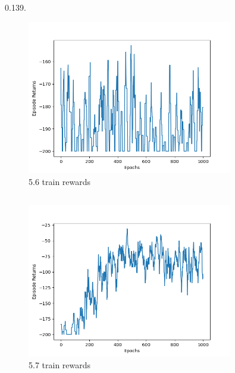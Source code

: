 \documentclass[12pt]{article}
\begin{document}
\subsection{}
0.139.
\begin{figure}[H]
    \centering
    \includegraphics[width=0.8\textwidth]{imgs/q6.png}
    \caption{5.6 train rewards}
\end{figure}

\subsection{}
\begin{figure}[H]
    \centering
    \includegraphics[width=0.8\textwidth]{imgs/q7.png}
    \caption{5.7 train rewards}
\end{figure}
\end{document}
